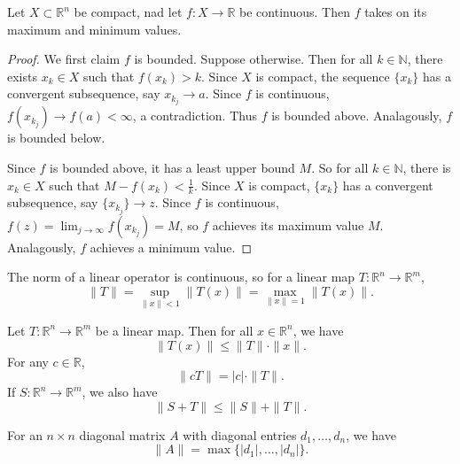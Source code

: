 \documentclass[12pt]{article}
\begin{document}
\begin{theorem}
	Let $X\subset\mathbb{R}^n$ be compact, nad let $f:X\to\mathbb{R}$ be continuous. Then $f$ takes on its maximum and minimum values.
\end{theorem}
\begin{proof} 
	We first claim $f$ is bounded. Suppose otherwise. Then for all $k\in\mathbb{N}$, there exists $x_k\in X$ such that $f(x_k)>k$. Since $X$ is compact, the sequence $\{x_k\}$ has a convergent subsequence, say $x_{k_j}\to a$. Since $f$ is continuous, $f(x_{k_j})\to f(a)<\infty$, a contradiction. Thus $f$ is bounded above. Analagously, $f$ is bounded below.

	Since $f$ is bounded above, it has a least upper bound $M$. So for all $k\in\mathbb{N}$, there is $x_k\in X$ such that $M-f(x_k)<\frac{1}{k}$. Since $X$ is compact, $\{x_k\}$ has a convergent subsequence, say $\{x_{k_j}\}\to z$. Since $f$ is continuous, $f(z)=\lim_{j\to\infty}f(x_{k_j})=M$, so $f$ achieves its maximum value $M$. Analagously, $f$ achieves a minimum value.
\end{proof}	

\begin{example}
	The norm of a linear operator is continuous, so for a linear map $T:\mathbb{R}^n\to\mathbb{R}^m$,
	\begin{equation*}
		\|T\| = \sup_{\|x\|<1}\|T(x)\| = \max_{\|x\|=1}\|T(x)\|.
	\end{equation*}
\end{example}

\begin{proposition}
	Let $T:\mathbb{R}^n\to\mathbb{R}^m$ be a linear map. Then for all $x\in\mathbb{R}^n$, we have 
	\begin{equation*}
		\|T(x)\| \leq \|T\|\cdot \|x\|.
	\end{equation*}
	For any $c\in\mathbb{R}$,
	\begin{equation*}
		\|cT\|=|c|\cdot\|T\|.
	\end{equation*}
	If $S:\mathbb{R}^n\to\mathbb{R}^m$, we also have 
	\begin{equation*}
		\|S+T\|\leq \|S\| + \|T\|.
	\end{equation*}
\end{proposition}

\begin{example}
	For an $n\times n$ diagonal matrix $A$ with diagonal entries $d_1,\dots,d_n$, we have 
	\begin{equation*}
		\|A\|=\max\{|d_1|,\dots,|d_n|\}.
	\end{equation*}
\end{example}
\end{document}
